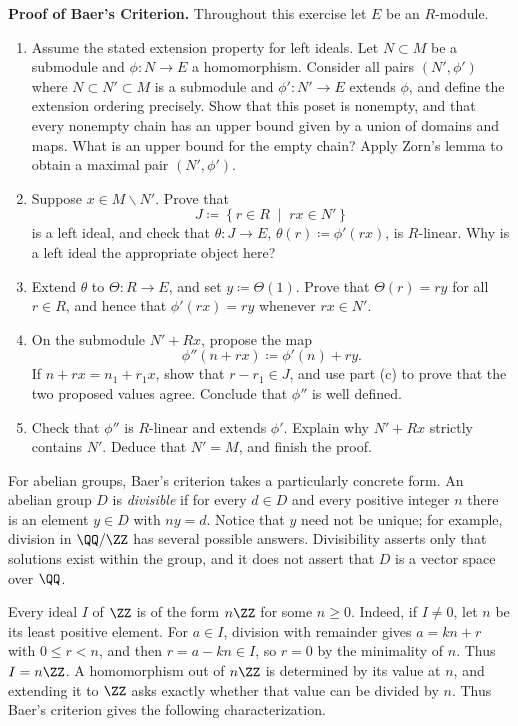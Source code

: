 \documentclass[12pt,reqno]{amsart}
\begin{document}
\hrulefill

\begin{problems}
\item\label{h:baer} \textbf{Proof of Baer's Criterion.} Throughout this exercise let $E$ be an $R$-module.
\begin{enumerate}
\item Assume the stated extension property for left ideals. Let $N\subset M$ be a submodule and $\phi:N\to E$ a homomorphism. Consider all pairs $(N',\phi')$ where $N\subset N'\subset M$ is a submodule and $\phi':N'\to E$ extends $\phi$, and define the extension ordering precisely. Show that this poset is nonempty, and that every nonempty chain has an upper bound given by a union of domains and maps. What is an upper bound for the empty chain? Apply Zorn's lemma to obtain a maximal pair $(N',\phi')$.
\item Suppose $x\in M\smallsetminus N'$. Prove that
\[
J\coloneqq\left\{r\in R \;\; \big| \;\; rx\in N'\right\}
\]
is a left ideal, and check that $\theta:J\to E$, $\theta(r)\coloneqq\phi'(rx)$, is $R$-linear. Why is a left ideal the appropriate object here?
\item Extend $\theta$ to $\Theta:R\to E$, and set $y\coloneqq\Theta(1)$. Prove that $\Theta(r)=ry$ for all $r\in R$, and hence that $\phi'(rx)=ry$ whenever $rx\in N'$.
\item On the submodule $N'+Rx$, propose the map
\[
\phi''(n+rx)\coloneqq\phi'(n)+ry.
\]
If $n+rx=n_1+r_1x$, show that $r-r_1\in J$, and use part (c) to prove that the two proposed values agree. Conclude that $\phi''$ is well defined.
\item Check that $\phi''$ is $R$-linear and extends $\phi'$. Explain why $N'+Rx$ strictly contains $N'$. Deduce that $N'=M$, and finish the proof.
\end{enumerate}
\end{problems}

\hrulefill

For abelian groups, Baer's criterion takes a particularly concrete form. An abelian group $D$ is \emph{divisible} if for every $d\in D$ and every positive integer $n$ there is an element $y\in D$ with $ny=d$. Notice that $y$ need not be unique; for example, division in $\QQ/\ZZ$ has several possible answers. Divisibility asserts only that solutions exist within the group, and it does not assert that $D$ is a vector space over $\QQ$.

Every ideal $I$ of $\ZZ$ is of the form $n\ZZ$ for some $n\geq0$. Indeed, if $I\neq0$, let $n$ be its least positive element. For $a\in I$, division with remainder gives $a=kn+r$ with $0\leq r<n$, and then $r=a-kn\in I$, so $r=0$ by the minimality of $n$. Thus $I=n\ZZ$. A homomorphism out of $n\ZZ$ is determined by its value at $n$, and extending it to $\ZZ$ asks exactly whether that value can be divided by $n$. Thus Baer's criterion gives the following characterization.
\end{document}
